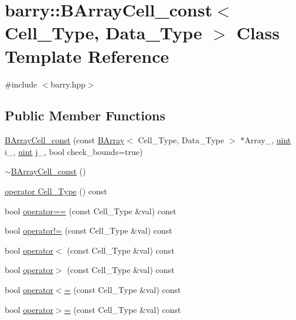 \hypertarget{classbarry_1_1_b_array_cell__const}{}\section{barry\+:\+:B\+Array\+Cell\+\_\+const$<$ Cell\+\_\+\+Type, Data\+\_\+\+Type $>$ Class Template Reference}
\label{classbarry_1_1_b_array_cell__const}


{\ttfamily \#include $<$barry.\+hpp$>$}

\subsection*{Public Member Functions}
\begin{DoxyCompactItemize}
\item 
\hyperlink{classbarry_1_1_b_array_cell__const_a2a08f3d4d219450e3543786c272cb877}{B\+Array\+Cell\+\_\+const} (const \hyperlink{classbarry_1_1_b_array}{B\+Array}$<$ Cell\+\_\+\+Type, Data\+\_\+\+Type $>$ $\ast$Array\+\_\+, \hyperlink{namespacebarry_a11dfc53ddb4672278319aa04f1e09a6c}{uint} i\+\_\+, \hyperlink{namespacebarry_a11dfc53ddb4672278319aa04f1e09a6c}{uint} j\+\_\+, bool check\+\_\+bounds=true)
\item 
\hyperlink{classbarry_1_1_b_array_cell__const_a8dc243a36580e9de288492eb7a2f19cd}{$\sim$\+B\+Array\+Cell\+\_\+const} ()
\item 
\hyperlink{classbarry_1_1_b_array_cell__const_ab5d767055c53b7024380a8011dad698a}{operator Cell\+\_\+\+Type} () const
\item 
bool \hyperlink{classbarry_1_1_b_array_cell__const_a267ac042fc28e411ca553f6f61cbe9b3}{operator==} (const Cell\+\_\+\+Type \&val) const
\item 
bool \hyperlink{classbarry_1_1_b_array_cell__const_a967bb71b2c9efefd1970959e1d498089}{operator!=} (const Cell\+\_\+\+Type \&val) const
\item 
bool \hyperlink{classbarry_1_1_b_array_cell__const_a93af7c10baa4961aa71350180e579459}{operator$<$} (const Cell\+\_\+\+Type \&val) const
\item 
bool \hyperlink{classbarry_1_1_b_array_cell__const_a2cf1300cf2b4670fe735e718482f5791}{operator$>$} (const Cell\+\_\+\+Type \&val) const
\item 
bool \hyperlink{classbarry_1_1_b_array_cell__const_a4221856ab5a0b1e149a99e776eee4614}{operator$<$=} (const Cell\+\_\+\+Type \&val) const
\item 
bool \hyperlink{classbarry_1_1_b_array_cell__const_af402da27396466b677cf4bcce94af6ed}{operator$>$=} (const Cell\+\_\+\+Type \&val) const
\end{DoxyCompactItemize}


